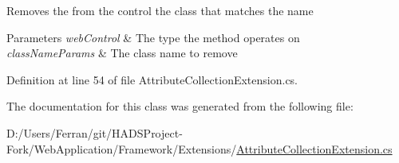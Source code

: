 Removes the from the control the class that matches the name 


\begin{DoxyParams}{Parameters}
{\em web\+Control} & The type the method operates on\\
\hline
{\em class\+Name\+Params} & The class name to remove\\
\hline
\end{DoxyParams}


Definition at line 54 of file Attribute\+Collection\+Extension.\+cs.



The documentation for this class was generated from the following file\+:\begin{DoxyCompactItemize}
\item 
D\+:/\+Users/\+Ferran/git/\+H\+A\+D\+S\+Project-\/\+Fork/\+Web\+Application/\+Framework/\+Extensions/\mbox{\hyperlink{AttributeCollectionExtension_8cs}{Attribute\+Collection\+Extension.\+cs}}\end{DoxyCompactItemize}
